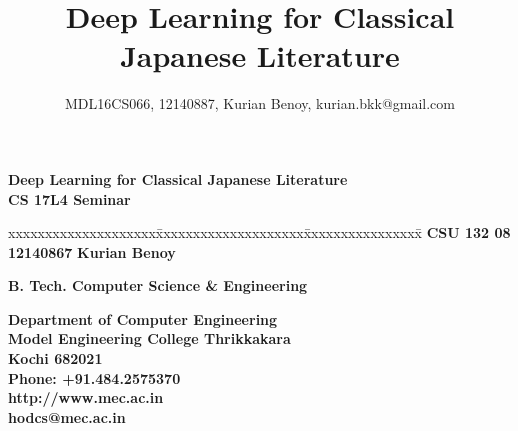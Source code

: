 \documentclass[12pt]{report}
\begin{document}
\renewcommand\bibname{References}
\pagestyle{fancy}
\fancyhead{}
\fancyfoot{}
\fancyfoot[r]{\thepage}
\renewcommand{\chaptermark}[1]{
\markboth{\thechapter.\ #1}{}} 
\renewcommand{\headrulewidth}{0.1pt}
\renewcommand{\footrulewidth}{0.1pt}
\fancyhead[r]{\slshape \leftmark}
\addtolength{\headheight}{\baselineskip}
\lhead{\nouppercase{\rightmark}}
\rhead{\nouppercase{\leftmark}}

\graphicspath{ {images/} }

\title {Deep Learning for Classical Japanese Literature }
\author {MDL16CS066, 12140887, Kurian Benoy, kurian.bkk@gmail.com }

\begin{titlepage}
\begin{center}

\Huge{\textbf{Deep Learning for Classical Japanese Literature}}\\
\vspace{.3in}
\large{\textbf{CS 17L4 Seminar\\}}
\vspace{1.0in}

\begin{tabbing}
xxxxxxxxxxxxxxxxxxxx\=xxxxxxxxxxxxxxxxxxxx\= xxxxxxxxxxxxxxxx\=\kill
\Large{\textbf{CSU 132 08 }}	\>\Large{\textbf{12140867}}	\>\Large{\textbf{Kurian Benoy}}\\ 
\end{tabbing}
 
\Large{\textbf{B. Tech. Computer Science \& Engineering
}}

\vspace{.6in}
\begin{figure}[h]
\begin{center}
\end{center}
\end{figure}
\textbf{
Department of Computer  Engineering\\
Model Engineering College Thrikkakara\\
Kochi 682021\\
Phone: +91.484.2575370\\
http://www.mec.ac.in \\ hodcs@mec.ac.in
\vspace{.1in}
}
\end{center}
\end{titlepage}
\end{document}
